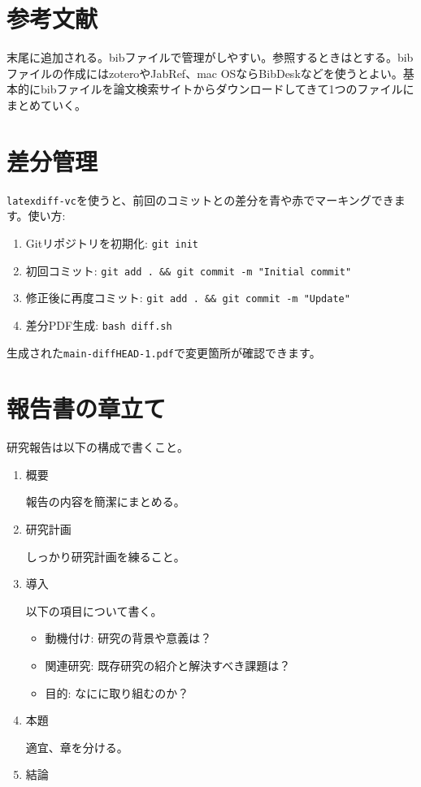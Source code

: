\documentclass[uplatex,dvipdfmx,a4j,11pt]{jsarticle}
\begin{document}
\section{参考文献}
末尾に追加される。bibファイルで管理がしやすい。参照するときは\cite{Fujiwara1984}とする。bibファイルの作成にはzoteroやJabRef、mac OSならBibDeskなどを使うとよい。基本的にbibファイルを論文検索サイトからダウンロードしてきて1つのファイルにまとめていく。

\section{差分管理}
\texttt{latexdiff-vc}を使うと、前回のコミットとの差分を青や赤でマーキングできます。使い方:
\begin{enumerate}
    \item Gitリポジトリを初期化: \texttt{git init}
    \item 初回コミット: \texttt{git add . \&\& git commit -m "Initial commit"}
    \item 修正後に再度コミット: \texttt{git add . \&\& git commit -m "Update"}
    \item 差分PDF生成: \texttt{bash diff.sh}
\end{enumerate}
生成された\texttt{main-diffHEAD-1.pdf}で変更箇所が確認できます。

\section{報告書の章立て}
研究報告は以下の構成で書くこと。
\begin{enumerate}
    \item 概要

    報告の内容を簡潔にまとめる。

    \item 研究計画
    
    しっかり研究計画を練ること。

    \item 導入

    以下の項目について書く。

    \begin{itemize}
        \item 動機付け: 研究の背景や意義は？
        \item 関連研究: 既存研究の紹介と解決すべき課題は？
        \item 目的: なにに取り組むのか？
    \end{itemize}

    \item 本題

    適宜、章を分ける。

    \item 結論
    
\end{enumerate}


\end{document}
